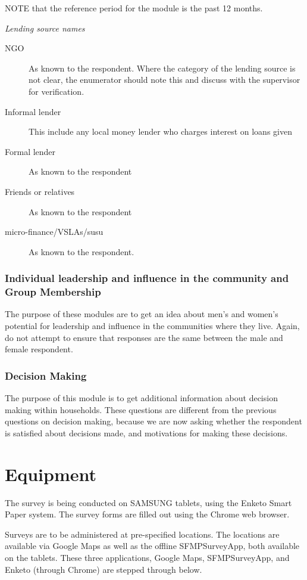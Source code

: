 \documentclass[a4paper]{refart}
\begin{document}
NOTE that the reference period for the module is the past 12 months.

\textit{Lending source names}
\begin{description}
\item[NGO] As known to the respondent. Where the category of the lending source is not clear, the enumerator should note this and discuss with the supervisor for verification.
\item[Informal lender] This include any local money lender who charges interest on loans given
\item[Formal lender] As known to the respondent
\item[Friends or relatives]  As known to the respondent
\item[micro-finance/VSLAs/susu]  As known to the respondent.
\end{description}

\subsubsection{Individual leadership and influence in the community and Group Membership}
The purpose of these modules are to get an idea about men's and women's potential for leadership and influence in the communities where they live. Again, do not attempt to ensure that responses are the same between the male and female respondent.

\subsubsection{Decision Making}
The purpose of this module is to get additional information about decision making within households. These questions are different from the previous questions on decision making, because we are now asking whether the respondent is satisfied about decisions made, and motivations for making these decisions.


\section{Equipment}
The survey is being conducted on SAMSUNG tablets, using the Enketo Smart Paper system. The survey forms are filled out using the Chrome web browser.

Surveys are to be administered at pre-specified locations. The locations are available via Google Maps as well as the offline SFMPSurveyApp, both available on the tablets. These three applications, Google Maps, SFMPSurveyApp, and Enketo (through Chrome) are stepped through below.
\end{document}
